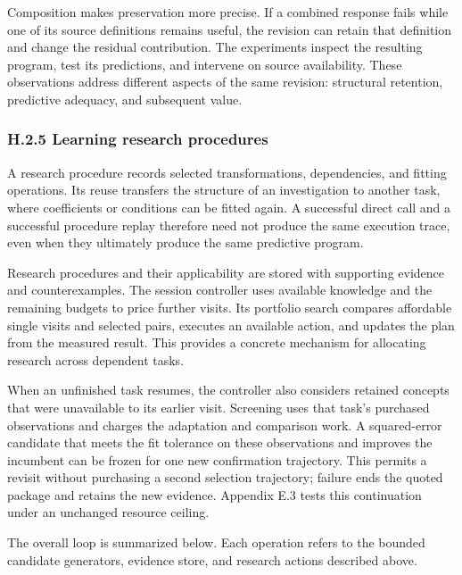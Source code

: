 \documentclass[twoside,11pt]{article}
\begin{document}
Composition makes preservation more precise. If a combined response fails while one of its source definitions remains useful, the revision can retain that definition and change the residual contribution. The experiments inspect the resulting program, test its predictions, and intervene on source availability. These observations address different aspects of the same revision: structural retention, predictive adequacy, and subsequent value.


\subsubsection*{H.2.5 Learning research procedures}

A research procedure records selected transformations, dependencies, and fitting operations. Its reuse transfers the structure of an investigation to another task, where coefficients or conditions can be fitted again. A successful direct call and a successful procedure replay therefore need not produce the same execution trace, even when they ultimately produce the same predictive program.


Research procedures and their applicability are stored with supporting evidence and counterexamples. The session controller uses available knowledge and the remaining budgets to price further visits. Its portfolio search compares affordable single visits and selected pairs, executes an available action, and updates the plan from the measured result. This provides a concrete mechanism for allocating research across dependent tasks.


When an unfinished task resumes, the controller also considers retained concepts
that were unavailable to its earlier visit. Screening uses that task's purchased
observations and charges the adaptation and comparison work. A squared-error
candidate that meets the fit tolerance on these observations and improves the
incumbent can be frozen for one new confirmation trajectory. This permits a
revisit without purchasing a second selection trajectory; failure ends the quoted
package and retains the new evidence. Appendix E.3 tests this continuation under
an unchanged resource ceiling.


The overall loop is summarized below. Each operation refers to the bounded candidate generators, evidence store, and research actions described above.
\end{document}
